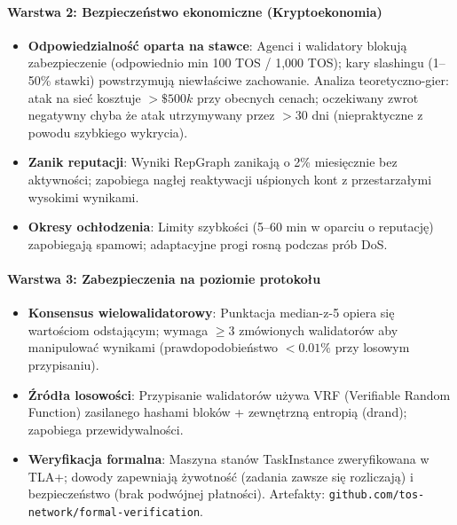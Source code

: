 \documentclass[11pt]{article}
\begin{document}
\paragraph{Warstwa 2: Bezpieczeństwo ekonomiczne (Kryptoekonomia)}
\begin{itemize}[noitemsep]
  \item \textbf{Odpowiedzialność oparta na stawce}: Agenci i walidatory blokują zabezpieczenie (odpowiednio min 100 TOS / 1,000 TOS); kary slashingu (1--50\% stawki) powstrzymują niewłaściwe zachowanie. Analiza teoretyczno-gier: atak na sieć kosztuje $>\$500k$ przy obecnych cenach; oczekiwany zwrot negatywny chyba że atak utrzymywany przez $>30$ dni (niepraktyczne z powodu szybkiego wykrycia).
  \item \textbf{Zanik reputacji}: Wyniki RepGraph zanikają o 2\% miesięcznie bez aktywności; zapobiega nagłej reaktywacji uśpionych kont z przestarzałymi wysokimi wynikami.
  \item \textbf{Okresy ochłodzenia}: Limity szybkości (5--60 min w oparciu o reputację) zapobiegają spamowi; adaptacyjne progi rosną podczas prób DoS.
\end{itemize}

\paragraph{Warstwa 3: Zabezpieczenia na poziomie protokołu}
\begin{itemize}[noitemsep]
  \item \textbf{Konsensus wielowalidatorowy}: Punktacja median-z-5 opiera się wartościom odstającym; wymaga $\geq3$ zmówionych walidatorów aby manipulować wynikami (prawdopodobieństwo $<0.01\%$ przy losowym przypisaniu).
  \item \textbf{Źródła losowości}: Przypisanie walidatorów używa VRF (Verifiable Random Function) zasilanego hashami bloków + zewnętrzną entropią (drand); zapobiega przewidywalności.
  \item \textbf{Weryfikacja formalna}: Maszyna stanów TaskInstance zweryfikowana w TLA+; dowody zapewniają żywotność (zadania zawsze się rozliczają) i bezpieczeństwo (brak podwójnej płatności). Artefakty: \texttt{github.com/tos-network/formal-verification}.
\end{itemize}
\end{document}
